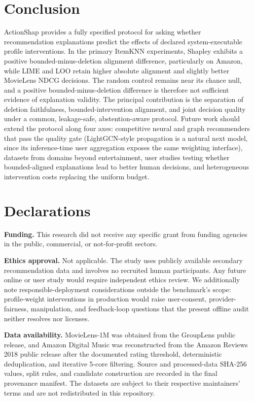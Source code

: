 \documentclass[a4paper,fleqn,doubleblind]{cas-sc}
\begin{document}
\section{Conclusion}
ActionShap provides a fully specified protocol for asking whether recommendation explanations predict the effects of declared system-executable profile interventions. In the primary ItemKNN experiments, Shapley exhibits a positive bounded-minus-deletion alignment difference, particularly on Amazon, while LIME and LOO retain higher absolute alignment and slightly better MovieLens NDCG decisions. The random control remains near its chance null, and a positive bounded-minus-deletion difference is therefore not sufficient evidence of explanation validity. The principal contribution is the separation of deletion faithfulness, bounded-intervention alignment, and joint decision quality under a common, leakage-safe, abstention-aware protocol.
Future work should extend the protocol along four axes: competitive neural and graph recommenders that pass the quality gate (LightGCN-style propagation is a natural next model, since its inference-time user aggregation exposes the same weighting interface), datasets from domains beyond entertainment, user studies testing whether bounded-aligned explanations lead to better human decisions, and heterogeneous intervention costs replacing the uniform budget.




\section*{Declarations}
\textbf{Funding.} This research did not receive any specific grant from funding agencies in the public, commercial, or not-for-profit sectors.

\textbf{Ethics approval.} Not applicable. The study uses publicly available secondary recommendation data and involves no recruited human participants. Any future online or user study would require independent ethics review. We additionally note responsible-deployment considerations outside the benchmark's scope: profile-weight interventions in production would raise user-consent, provider-fairness, manipulation, and feedback-loop questions that the present offline audit neither resolves nor licenses.

\textbf{Data availability.} MovieLens-1M was obtained from the GroupLens public release, and Amazon Digital Music was reconstructed from the Amazon Reviews 2018 public release after the documented rating threshold, deterministic deduplication, and iterative 5-core filtering. Source and processed-data SHA-256 values, split rules, and candidate construction are recorded in the final provenance manifest. The datasets are subject to their respective maintainers' terms and are not redistributed in this repository.
\end{document}
